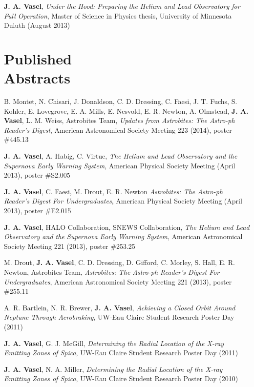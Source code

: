 \documentclass{cv}
\begin{document}
\begin{resume}
\textbf{J. A. Vasel}, \emph{Under the Hood: Preparing the Helium and Lead Observatory for Full Operation}, Master of Science in Physics thesis, University of Minnesota Duluth (August 2013)
\itemSep

\section{Published \\ Abstracts}

B. Montet, N. Chisari, J. Donaldson, C. D. Dressing, C. Faesi, J. T. Fuchs, S. Kohler, E. Lovegrove, E. A. Mills, E. Nesvold, E. R. Newton, A. Olmstead, \textbf{J. A. Vasel}, L. M. Weiss, Astrobites Team, \emph{Updates from Astrobites: The Astro-ph Reader's Digest}, American Astronomical Society Meeting 223 (2014), poster \#445.13
\itemSep

\textbf{J. A. Vasel}, A. Habig, C. Virtue, \emph{The Helium and Lead Observatory and the Supernova Early Warning System}, American Physical Society Meeting (April 2013), poster \#S2.005

\textbf{J. A. Vasel}, C. Faesi, M. Drout, E. R. Newton \emph{Astrobites: The Astro-ph Reader's Digest For Undergraduates}, American Physical Society Meeting (April 2013), poster \#E2.015

\textbf{J. A. Vasel}, HALO Collaboration, SNEWS Collaboration, \emph{The Helium and Lead Observatory and the Supernova Early Warning System}, American Astronomical Society Meeting 221 (2013), poster \#253.25

M. Drout, \textbf{J. A. Vasel}, C. D. Dressing, D. Gifford, C. Morley, S. Hall, E. R. Newton, Astrobites Team, \emph{Astrobites: The Astro-ph Reader's Digest For Undergraduates}, American Astronomical Society Meeting 221 (2013), poster \#255.11

A. R. Bartlein, N. R. Brewer, \textbf{J. A. Vasel}, \emph{Achieving a Closed Orbit Around Neptune Through Aerobraking}, UW-Eau Claire Student Research Poster Day (2011)

\textbf{J. A. Vasel}, G. J. McGill, \emph{Determining the Radial Location of the X-ray Emitting Zones of Spica}, UW-Eau Claire Student Research Poster Day (2011)

\textbf{J. A. Vasel}, N. A. Miller, \emph{Determining the Radial Location of the X-ray Emitting Zones of Spica}, UW-Eau Claire Student Research Poster Day (2010)




\end{resume}
\end{document}
